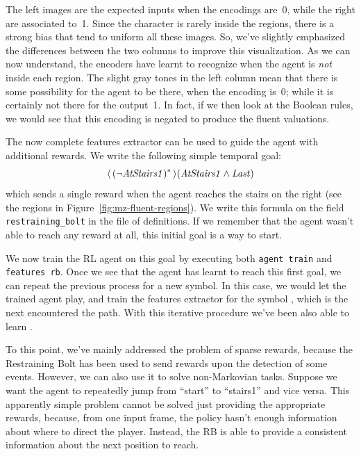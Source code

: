 The left images are the expected inputs when the encodings are~0, while
the right are associated to~1. Since the character is rarely inside the
regions, there is a strong bias that tend to uniform all these images. So,
we've slightly emphasized the differences between the two columns to improve
this visualization. As we can now understand, the encoders have learnt to
recognize when the agent is \emph{not} inside each region. The slight gray
tones in the left column mean that there is some possibility for the agent to
be there, when the encoding is~0; while it is certainly not there for the
output~1. In fact, if we then look at the Boolean rules, we would see that
this encoding is negated to produce the fluent valuations.

The now complete features extractor can be used to guide the agent with
additional rewards. We write the following simple temporal goal:
\begin{equation}
	\langle\, {(\neg \text{\textit{AtStairs1}})^*} \,\rangle(\text{\textit{AtStairs1}} \land \text{\textit{Last}})
\end{equation}
which sends a single reward when the agent reaches the stairs on the right
(see the regions in Figure~\ref{fig:mz-fluent-regions}). We write this formula
on the field \texttt{restraining\_bolt} in the file of definitions. If we
remember that the agent wasn't able to reach any reward at all, this initial
goal is a way to start.

We now train the RL agent on this goal by executing both \verb|agent train|
and \verb|features rb|. Once we see that the agent has learnt to reach this
first goal, we can repeat the previous process for a new symbol. In this case,
we would let the trained agent play, and train the features extractor for the
symbol , which is the next encountered the path.  With
this iterative procedure we've been also able to learn .

To this point, we've mainly addressed the problem of sparse rewards, because
the Restraining Bolt has been used to send rewards upon the detection of some
events.  However, we can also use it to solve non-Markovian tasks.
Suppose we want the agent to repeatedly jump from ``start'' to ``stairs1'' and
vice versa. This apparently simple problem cannot be solved just providing the
appropriate rewards, because, from one input frame, the policy hasn't
enough information about where to direct the player. Instead, the RB is able
to provide a consistent information about the next position to reach.

